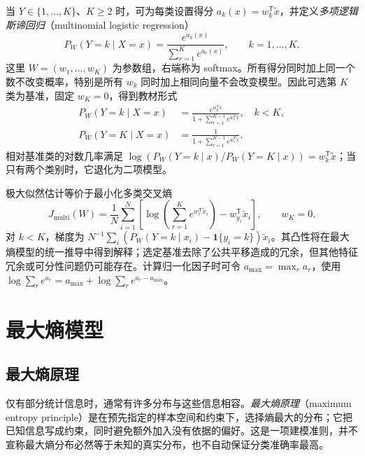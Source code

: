 当 $Y\in\{1,\ldots,K\}$、$K\geq2$ 时，可为每类设置得分 $a_k(x)=w_k^{\mathsf T}\widetilde x$，并定义\emph{多项逻辑斯谛回归}（multinomial logistic regression）
\begin{equation}
P_W(Y=k\mid X=x)=\frac{e^{a_k(x)}}{\sum_{r=1}^Ke^{a_r(x)}},
\qquad k=1,\ldots,K.
\label{eq:lh-softmax}
\end{equation}
这里 $W=(w_1,\ldots,w_K)$ 为参数组，右端称为 softmax。所有得分同时加上同一个数不改变概率，特别是所有 $w_k$ 同时加上相同向量不会改变模型。因此可选第 $K$ 类为基准，固定 $w_K=0$，得到教材形式
\begin{equation}
\begin{aligned}
P_W(Y=k\mid X=x)&=\frac{e^{w_k^{\mathsf T}\widetilde x}}
{1+\sum_{r=1}^{K-1}e^{w_r^{\mathsf T}\widetilde x}},\quad k<K,\\
P_W(Y=K\mid X=x)&=\frac1{1+\sum_{r=1}^{K-1}e^{w_r^{\mathsf T}\widetilde x}}.
\end{aligned}
\label{eq:lh-baseline-softmax}
\end{equation}
相对基准类的对数几率满足 $\log(P_W(Y=k\mid x)/P_W(Y=K\mid x))=w_k^{\mathsf T}\widetilde x$；当只有两个类别时，它退化为二项模型。

极大似然估计等价于最小化多类交叉熵
\begin{equation}
J_{\mathrm{multi}}(W)=\frac1N\sum_{i=1}^N
\left[\log\left(\sum_{r=1}^Ke^{w_r^{\mathsf T}\widetilde x_i}\right)
-w_{y_i}^{\mathsf T}\widetilde x_i\right],\qquad w_K=0.
\label{eq:lh-multiclass-objective}
\end{equation}
对 $k<K$，梯度为 $N^{-1}\sum_i(P_W(Y=k\mid x_i)-\mathbf1\{y_i=k\})\widetilde x_i$。其凸性将在最大熵模型的统一推导中得到解释；选定基准去除了公共平移造成的冗余，但其他特征冗余或可分性问题仍可能存在。计算归一化因子时可令 $a_{\max}=\max_r a_r$，使用 $\log\sum_re^{a_r}=a_{\max}+\log\sum_re^{a_r-a_{\max}}$。

\section{最大熵模型}
\label{sec:lh-maxent}

\subsection{最大熵原理}
\label{subsec:lh-maxent-principle}

仅有部分统计信息时，通常有许多分布与这些信息相容。\emph{最大熵原理}（maximum entropy principle）是在预先指定的样本空间和约束下，选择熵最大的分布；它把已知信息写成约束，同时避免额外加入没有依据的偏好。这是一项建模准则，并不宣称最大熵分布必然等于未知的真实分布，也不自动保证分类准确率最高。

